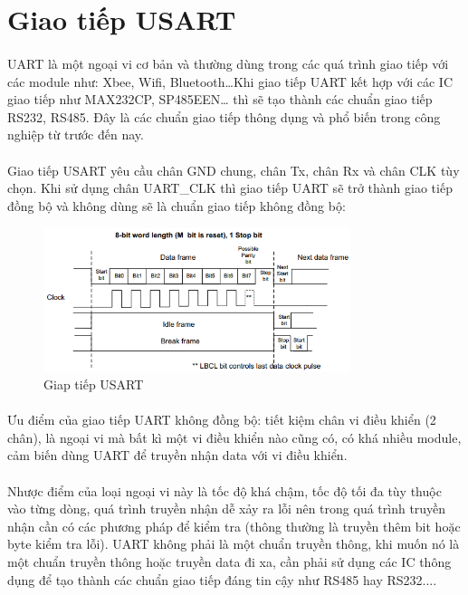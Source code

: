 \section{Giao tiếp USART}
\paragraph{}
UART là một ngoại vi cơ bản và thường dùng trong các quá trình giao tiếp với các module như: Xbee, Wifi, Bluetooth…Khi giao tiếp UART kết hợp với các IC giao tiếp như MAX232CP, SP485EEN… thì sẽ tạo thành các chuẩn giao tiếp RS232, RS485. Đây là các chuẩn giao tiếp thông dụng và phổ biến trong công nghiệp từ trước đến nay.
\paragraph{}
Giao tiếp USART yêu cầu chân GND chung, chân Tx, chân Rx và chân CLK tùy chọn. Khi sử dụng chân UART\_CLK thì giao tiếp UART sẽ trở thành giao tiếp đồng bộ và không dùng sẽ là chuẩn giao tiếp không đồng bộ:
\begin{figure}[H]
    \centering
    \includegraphics[width=0.8\textwidth]{images/uart-2.png}
    \caption{Giap tiếp USART}
    \label{fig:uart}
\end{figure}

\paragraph{}
Ưu điểm của giao tiếp UART không đồng bộ: tiết kiệm chân vi điều khiển (2 chân), là ngoại vi mà bất kì một vi điều khiển nào cũng có, có khá nhiều module, cảm biến dùng UART để truyền nhận data với vi điều khiển. 
\paragraph{}
Nhược điểm của loại ngoại vi này là tốc độ khá chậm, tốc độ tối đa tùy thuộc vào từng dòng, quá trình truyền nhận dễ xảy ra lỗi nên trong quá trình truyền nhận cần có các phương pháp để kiểm tra (thông thường là truyền thêm bit hoặc byte kiểm tra lỗi). UART không phải là một chuẩn truyền thông, khi muốn nó là một chuẩn truyền thông hoặc truyền data đi xa, cần phải sử dụng các IC thông dụng để tạo thành các chuẩn giao tiếp đáng tin cậy như RS485 hay RS232....
